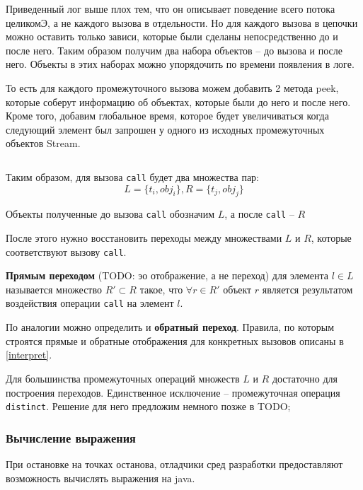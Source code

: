 Приведенный лог выше плох тем, что он описывает поведение всего потока целикомЭ, а не каждого вызова в отдельности. Но для каждого вызова в цепочки можно оставить только зависи, которые были сделаны непосредственно до и после него. Таким образом получим два набора объектов -- до вызова и после него. Объекты в этих наборах можно упорядочить по времени появления в логе. 

То есть для каждого промежуточного вызова можем добавить 2 метода peek, которые соберут информацию об объектах, которые были до него и после него. Кроме того, добавим глобальное время, которое будет увеличиваться когда следующий элемент был запрошен у одного из исходных промежуточных объектов Stream.

\inputminted{java}{chapter2/code/LocalChainModification.java}

Таким образом, для вызова \texttt{call} будет два множества пар: 
\begin{equation*}
	L = \{t_i, obj_i\}, R = \{t_j, obj_j\}
\end{equation*}

Объекты полученные до вызова \texttt{call} обозначим $L$, а после \texttt{call} -- $R$

После этого нужно восстановить переходы между множествами $L$ и $R$, которые соответствуют вызову \texttt{call}.

\textbf{Прямым переходом} (TODO: эо отображение, а не переход) для элемента $l \in L$ называется множество $R' \subset R$ такое, что $\forall r \in R'$ объект $r$ является результатом воздействия операции \texttt{call} на элемент $l$.

По аналогии можно определить и \textbf{обратный переход}.
Правила, по которым строятся прямые и обратные отображения для конкретных вызовов описаны в \ref{interpret}.

Для большинства промежуточных операций множеств $L$ и $R$ достаточно для построения переходов. Единственное исключение -- промежуточная операция \texttt{distinct}. Решение для него предложим немного позже в TODO;

\subsubsection{Вычисление выражения}
При остановке на точках останова, отладчики сред разработки предоставляют возможность вычислять выражения на java. 

